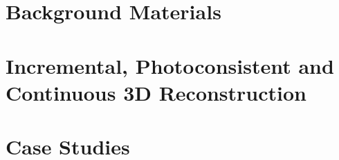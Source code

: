\documentclass[10pt,twoside,openright,english]{book}%
\begin{document}

\maketitle

\pagestyle{empty}

\cleardoublepage
\newpage

%

\cleardoublepage
\newpage

\pagestyle{fancy}
\setcounter{page}{1}





\dominitoc%
\tableofcontents
\cleardoublepage
\newpage

\setcounter{page}{1}

\cleardoublepage

\part{Background Materials}




\part{Incremental, Photoconsistent and Continuous 3D Reconstruction}



\part{Case Studies}




\cleardoublepage

\appendix
{}





\cleardoublepage
{}
{}
\small


\end{document}
